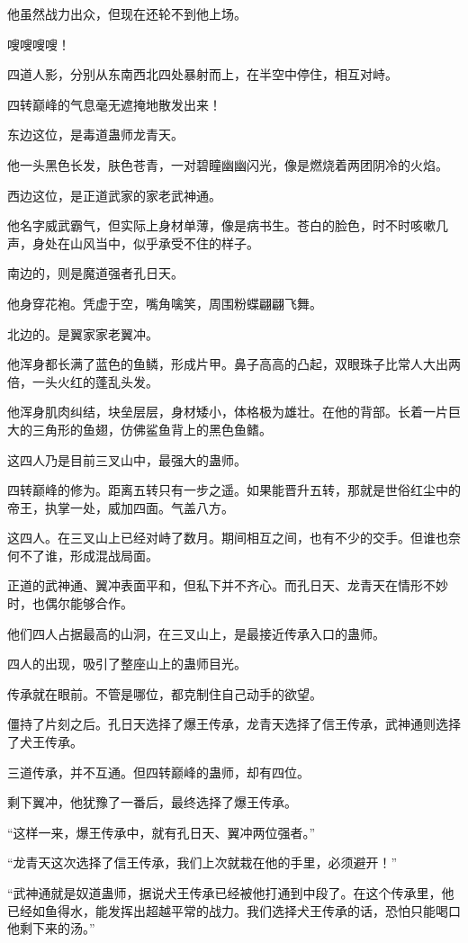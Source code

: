 \begin{this_body}
他虽然战力出众，但现在还轮不到他上场。

嗖嗖嗖嗖！

四道人影，分别从东南西北四处暴射而上，在半空中停住，相互对峙。

四转巅峰的气息毫无遮掩地散发出来！

东边这位，是毒道蛊师龙青天。

他一头黑色长发，肤色苍青，一对碧瞳幽幽闪光，像是燃烧着两团阴冷的火焰。

西边这位，是正道武家的家老武神通。

他名字威武霸气，但实际上身材单薄，像是病书生。苍白的脸色，时不时咳嗽几声，身处在山风当中，似乎承受不住的样子。

南边的，则是魔道强者孔日天。

他身穿花袍。凭虚于空，嘴角噙笑，周围粉蝶翩翩飞舞。

北边的。是翼家家老翼冲。

他浑身都长满了蓝色的鱼鳞，形成片甲。鼻子高高的凸起，双眼珠子比常人大出两倍，一头火红的蓬乱头发。

他浑身肌肉纠结，块垒层层，身材矮小，体格极为雄壮。在他的背部。长着一片巨大的三角形的鱼翅，仿佛鲨鱼背上的黑色鱼鳍。

这四人乃是目前三叉山中，最强大的蛊师。

四转巅峰的修为。距离五转只有一步之遥。如果能晋升五转，那就是世俗红尘中的帝王，执掌一处，威加四面。气盖八方。

这四人。在三叉山上已经对峙了数月。期间相互之间，也有不少的交手。但谁也奈何不了谁，形成混战局面。

正道的武神通、翼冲表面平和，但私下并不齐心。而孔日天、龙青天在情形不妙时，也偶尔能够合作。

他们四人占据最高的山洞，在三叉山上，是最接近传承入口的蛊师。

四人的出现，吸引了整座山上的蛊师目光。

传承就在眼前。不管是哪位，都克制住自己动手的欲望。

僵持了片刻之后。孔日天选择了爆王传承，龙青天选择了信王传承，武神通则选择了犬王传承。

三道传承，并不互通。但四转巅峰的蛊师，却有四位。

剩下翼冲，他犹豫了一番后，最终选择了爆王传承。

“这样一来，爆王传承中，就有孔日天、翼冲两位强者。”

“龙青天这次选择了信王传承，我们上次就栽在他的手里，必须避开！”

“武神通就是奴道蛊师，据说犬王传承已经被他打通到中段了。在这个传承里，他已经如鱼得水，能发挥出超越平常的战力。我们选择犬王传承的话，恐怕只能喝口他剩下来的汤。”


\end{this_body}
